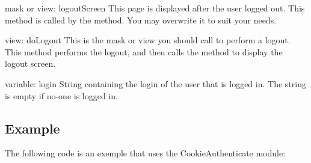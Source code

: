 \begin{funcdesc}{mask or view: logoutScreen}{}
This page is displayed after the user logged out. This method is called by the  method.
You may overwrite it to suit your needs.
\end{funcdesc}

\begin{funcdesc}{view: doLogout}{}
This is the mask or view you should call to perform a logout. This method performs the logout, and then calls
the  method to display the logout screen.
\end{funcdesc}

\begin{memberdesc}{variable: login}
String containing the login of the user that is logged in. The string is empty if no-one is logged in.
\end{memberdesc}

\begin{seealso}
\end{seealso}


\subsection{Example}
The following code is an exemple that uses the CookieAuthenticate module:

